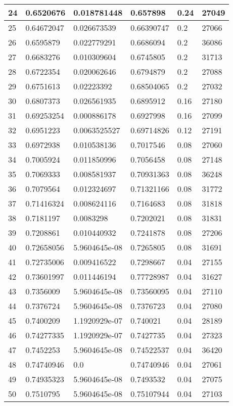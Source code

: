 \begin{longtable}{|l|l|l|l|l|l|}
24 & 0.6520676 & 0.018781448 & 0.657898 & 0.24 & 27049 \\ \hline 
25 & 0.64672047 & 0.026673539 & 0.66390747 & 0.2 & 27066 \\ \hline 
26 & 0.6595879 & 0.022779291 & 0.6686094 & 0.2 & 36086 \\ \hline 
27 & 0.6683276 & 0.010309604 & 0.6745805 & 0.2 & 31713 \\ \hline 
28 & 0.6722354 & 0.020062646 & 0.6794879 & 0.2 & 27088 \\ \hline 
29 & 0.6751613 & 0.02223392 & 0.68504065 & 0.2 & 27032 \\ \hline 
30 & 0.6807373 & 0.026561935 & 0.6895912 & 0.16 & 27180 \\ \hline 
31 & 0.69253254 & 0.000886178 & 0.6927998 & 0.16 & 27099 \\ \hline 
32 & 0.6951223 & 0.0063525527 & 0.69714826 & 0.12 & 27191 \\ \hline 
33 & 0.6972938 & 0.010538136 & 0.7017546 & 0.08 & 27060 \\ \hline 
34 & 0.7005924 & 0.011850996 & 0.7056458 & 0.08 & 27148 \\ \hline 
35 & 0.7069333 & 0.008581937 & 0.70931363 & 0.08 & 36248 \\ \hline 
36 & 0.7079564 & 0.012324697 & 0.71321166 & 0.08 & 31772 \\ \hline 
37 & 0.71416324 & 0.008624116 & 0.7164683 & 0.08 & 31818 \\ \hline 
38 & 0.7181197 & 0.0083298 & 0.7202021 & 0.08 & 31831 \\ \hline 
39 & 0.7208861 & 0.010440932 & 0.7241878 & 0.08 & 27206 \\ \hline 
40 & 0.72658056 & 5.9604645e-08 & 0.7265805 & 0.08 & 31691 \\ \hline 
41 & 0.72735006 & 0.009416522 & 0.7298667 & 0.04 & 27155 \\ \hline 
42 & 0.73601997 & 0.011446194 & 0.77728987 & 0.04 & 31627 \\ \hline 
43 & 0.7356009 & 5.9604645e-08 & 0.73560095 & 0.04 & 27110 \\ \hline 
44 & 0.7376724 & 5.9604645e-08 & 0.7376723 & 0.04 & 27080 \\ \hline 
45 & 0.7400209 & 1.1920929e-07 & 0.740021 & 0.04 & 28189 \\ \hline 
46 & 0.74277335 & 1.1920929e-07 & 0.7427735 & 0.04 & 27323 \\ \hline 
47 & 0.7452253 & 5.9604645e-08 & 0.74522537 & 0.04 & 36420 \\ \hline 
48 & 0.74740946 & 0.0 & 0.74740946 & 0.04 & 27061 \\ \hline 
49 & 0.74935323 & 5.9604645e-08 & 0.7493532 & 0.04 & 27075 \\ \hline 
50 & 0.7510795 & 5.9604645e-08 & 0.75107944 & 0.04 & 27103 \\ \hline 
\end{longtable}